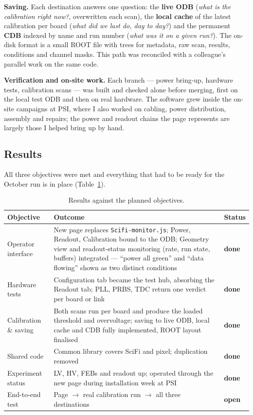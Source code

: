 \documentclass[10.5pt,a4paper]{article}
\newcommand{\pill}[1]{{\sffamily\bfseries\small\color{navy}#1}\;}
\begin{document}
\pill{Saving.}
Each destination answers one question: the \textbf{live ODB} (\emph{what is the
calibration right now?}, overwritten each scan), the \textbf{local cache} of
the latest calibration per board (\emph{what did we last do, day to day?}) and
the permanent \textbf{CDB} indexed by name and run number (\emph{what was it on
a given run?}). The on-disk format is a small ROOT file with trees for
metadata, raw scan, results, conditions and channel masks. This path was
reconciled with a colleague's parallel work on the same code.

\pill{Verification and on-site work.}
Each branch --- power bring-up, hardware tests, calibration scans --- was built
and checked alone before merging, first on the local test ODB and then on real
hardware. The software grew inside the on-site campaigns at PSI, where I also
worked on cabling, power distribution, assembly and repairs; the power and
readout chains the page represents are largely those I helped bring up by hand.

\subsection{Results}

All three objectives were met and everything that had to be ready for the
October run is in place (Table~\ref{tab:res}).

\begin{table}[h]
\centering\small\sffamily
\renewcommand{\arraystretch}{1.25}
\begin{tabular}{@{}p{3.3cm}p{9.3cm}p{1.6cm}@{}}
\toprule
\textbf{Objective} & \textbf{Outcome} & \textbf{Status}\\
\midrule
Operator interface & New page replaces \texttt{Scifi-monitor.js}; Power, Readout,
Calibration bound to the ODB; Geometry view and readout-status monitoring
(rate, run state, buffers) integrated --- ``power all green'' and ``data
flowing'' shown as two distinct conditions & \textcolor{okgreen}{\textbf{done}}\\
Hardware tests & Configuration tab became the test hub, absorbing the Readout
tab; PLL, PRBS, TDC return one verdict per board or link & \textcolor{okgreen}{\textbf{done}}\\
Calibration \& saving & Both scans run per board and produce the loaded
threshold and overvoltage; saving to live ODB, local cache and CDB fully
implemented, ROOT layout finalised & \textcolor{okgreen}{\textbf{done}}\\
Shared code & Common library covers SciFi and pixel; duplication removed &
\textcolor{okgreen}{\textbf{done}}\\
Experiment status & LV, HV, FEBs and readout up; operated through the new page
during installation week at PSI & \textcolor{okgreen}{\textbf{done}}\\
End-to-end test & Page $\to$ real calibration run $\to$ all three destinations &
\textcolor{warnorange}{\textbf{open}}\\
\bottomrule
\end{tabular}
\caption{Results against the planned objectives.}
\label{tab:res}
\end{table}
\end{document}
